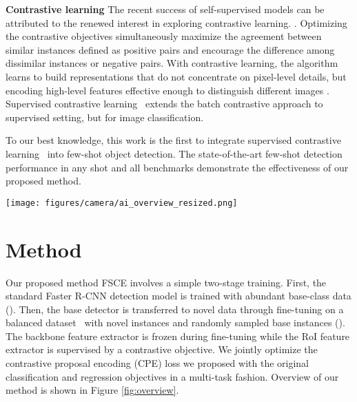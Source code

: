 \documentclass[final]{cvpr}
\begin{document}
\textbf{Contrastive learning}
The recent success of self-supervised models can be attributed to the renewed interest in exploring contrastive learning. \cite{hjelm_learning_2018,wu_unsupervised_2018,oord_representation_2019,chuang_debiased_2020,he_momentum_2020,chen_improved_2020,chen_simple_2020,chen_big_2020}. Optimizing the contrastive objectives \cite{oord_representation_2019,cos_face,deng_arcface_2019,supervised_contrastive_learning} simultaneously maximize the agreement between similar instances defined as positive pairs and encourage the difference among dissimilar instances or negative pairs. With contrastive learning, the algorithm learns to build representations that do not concentrate on pixel-level details, but encoding high-level features effective enough to distinguish different images \cite{chen_simple_2020,he_momentum_2020,chen_improved_2020,chen_big_2020}. Supervised contrastive learning~\cite{supervised_contrastive_learning} extends the batch contrastive approach to supervised setting, but for image classification. 

To our best knowledge, this work is the first to integrate supervised contrastive learning~\cite{sun2014deep,supervised_contrastive_learning} into few-shot object detection. The state-of-the-art few-shot detection performance in any shot and all benchmarks demonstrate the effectiveness of our proposed method.




\begin{figure*}[t]
\texttt{[image: figures/camera/ai\_overview\_resized.png]}
\centering
\caption{Overview of our proposed FSCE. In our method, we jointly fine-tune the FPN pathway and RPN while fixing the backbone. We find this is effective in coordinating backbone feature maps to activate on novel objects yet still avoid the risk of overfitting. To learn contrastive object proposal encodings, we introduce a contrastive branch to guide the RoI features to learn contrastive-aware proposal embeddings. We design a contrastive objective to maximize the within-category agreement and cross-category disagreement.} 
\label{fig:overview}\end{figure*}




\section{Method}
Our proposed method FSCE involves a simple two-stage training. First, the standard Faster R-CNN detection model is trained with abundant base-class data (). Then, the base detector is transferred to novel data through fine-tuning on a balanced dataset~\cite{wang_cspnet_2019} with novel instances and randomly sampled base instances (). The backbone feature extractor is frozen during fine-tuning while the RoI feature extractor is supervised by a contrastive objective. We jointly optimize the contrastive proposal encoding (CPE) loss we proposed with the original classification and regression objectives in a multi-task fashion. Overview of our method is shown in Figure \ref{fig:overview}.
\end{document}
